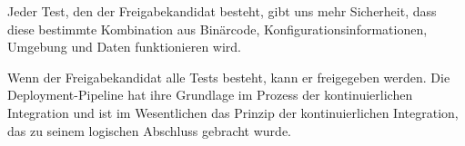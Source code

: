 Jeder Test, den der Freigabekandidat besteht, gibt uns mehr Sicherheit, dass diese bestimmte Kombination aus Binärcode, Konfigurationsinformationen, Umgebung und Daten funktionieren wird. 

Wenn der Freigabekandidat alle Tests besteht, kann er freigegeben werden. Die Deployment-Pipeline hat ihre Grundlage im Prozess der kontinuierlichen Integration und ist im Wesentlichen das Prinzip der kontinuierlichen Integration, das zu seinem logischen Abschluss gebracht wurde. 



